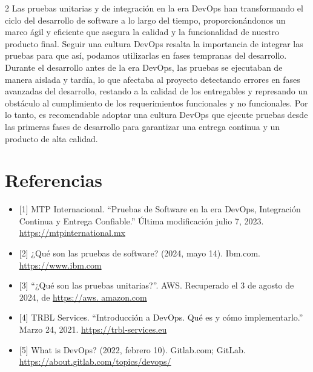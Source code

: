 \documentclass[12pt,spanish,Letterpaper,openany]{book}
\begin{document}
\begin {multicols}{2}
Las pruebas unitarias y de integración en la era DevOps han transformando el ciclo del desarrollo de software a lo largo del tiempo, proporcionándonos un marco ágil y eficiente que asegura la calidad y la funcionalidad de nuestro producto final. Seguir una cultura DevOps resalta la importancia de integrar las pruebas para que así, podamos utilizarlas en fases tempranas del desarrollo. Durante el desarrollo antes de la era DevOps, las pruebas se
ejecutaban de manera aislada y tardía, lo que afectaba al proyecto detectando errores en fases avanzadas del desarrollo, restando a la calidad de los entregables y represando un obstáculo al cumplimiento de los requerimientos funcionales y no funcionales. Por lo tanto, es recomendable adoptar una cultura DevOps que ejecute pruebas desde las primeras fases de desarrollo para garantizar una entrega continua y un producto de alta calidad.

\hypertarget{referencias-5}{%
\section{Referencias}\label{referencias-5}}

\begin{itemize}
\item
  {[}1{]} MTP Internacional. ``Pruebas de Software en la era DevOps, Integración Continua y Entrega Confiable.'' Última modificación julio 7, 2023.
  \href{https://mtpinternational.mx/testing-de-software/pruebas-de-software-en-la-era-devops-integracion-continua-y-entrega-confiable/}{https://mtpinternational.mx}
\item
  {[}2{]} ¿Qué son las pruebas de software? (2024, mayo 14). Ibm.com. \href{https://www.ibm.com/es-es/topics/software-testing}{https://www.ibm.com}
\item
  {[}3{]} ``¿Qué son las pruebas unitarias?''. AWS. Recuperado el 3 de agosto de 2024, de \href{https://aws.amazon.com/es/what-is/unit-testing/}{https://aws.
  amazon.com}
\item
  {[}4{]} TRBL Services. ``Introducción a DevOps. Qué es y cómo implementarlo.'' Marzo 24, 2021. \href{https://trbl-services.eu/blog-introduccion-devops/}{https://trbl-services.eu}
\item
  {[}5{]} What is DevOps? (2022, febrero 10). Gitlab.com; GitLab. \url{https://about.gitlab.com/topics/devops/}
\end{itemize}

\end {multicols}
\end{document}
